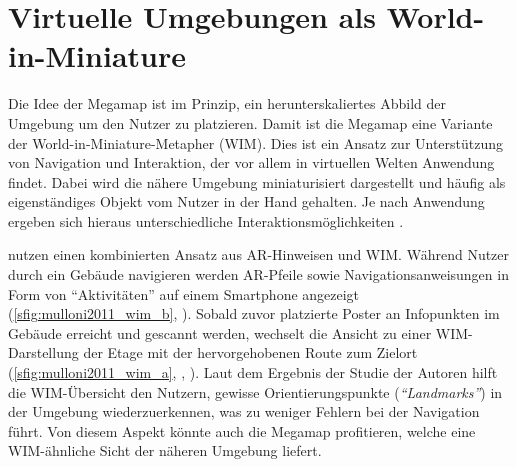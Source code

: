 \section{Virtuelle Umgebungen als World-in-Miniature}
Die Idee der Megamap ist im Prinzip, ein herunterskaliertes Abbild der Umgebung um den Nutzer zu platzieren.
Damit ist die Megamap eine Variante der World-in-Miniature-Metapher (WIM).
Dies ist ein Ansatz zur Unterstützung von Navigation und Interaktion, der vor allem in virtuellen Welten Anwendung findet.
Dabei wird die nähere Umgebung miniaturisiert dargestellt und häufig als eigenständiges Objekt vom Nutzer in der Hand gehalten.
Je nach Anwendung ergeben sich hieraus unterschiedliche Interaktionsmöglichkeiten \parencite{Stoakley1995}.

\textcites{Mulloni2011a}{Mulloni2012} nutzen einen kombinierten Ansatz aus AR-Hinweisen und WIM.\@
Während Nutzer durch ein Gebäude navigieren werden AR-Pfeile sowie Navigationsanweisungen in Form von \enquote{Aktivitäten} auf einem Smartphone angezeigt (\autoref{sfig:mulloni2011_wim_b}, ).
Sobald zuvor platzierte Poster an Infopunkten im Gebäude erreicht und gescannt werden, wechselt die Ansicht zu einer WIM-Darstellung der Etage mit der hervorgehobenen Route zum Zielort (\autoref{sfig:mulloni2011_wim_a}, , ).
Laut dem Ergebnis der Studie der Autoren hilft die WIM-Übersicht den Nutzern, gewisse Orientierungspunkte (\emph{\enquote{Landmarks}}) in der Umgebung wiederzuerkennen, was zu weniger Fehlern bei der Navigation führt.
Von diesem Aspekt könnte auch die Megamap profitieren, welche eine WIM-ähnliche Sicht der näheren Umgebung liefert.

